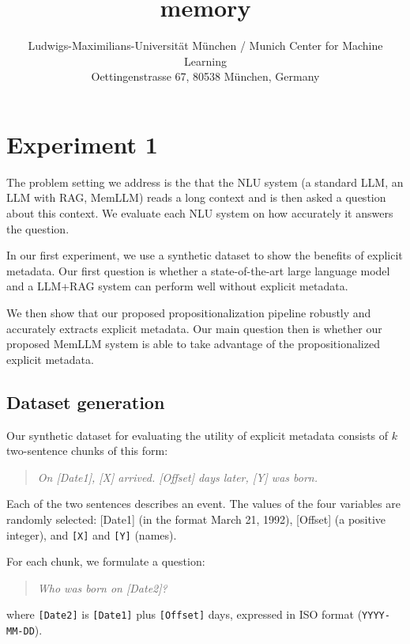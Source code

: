 \documentclass[11pt]{article}
\title{memory}
\author{  Ludwigs-Maximilians-Universität München / Munich Center for Machine Learning\\
  Oettingenstrasse 67, 80538 München, Germany \\
}
\begin{document}
\maketitle
\begin{abstract}

\end{abstract}



\section{Experiment 1}
The problem setting we address is the that the NLU system
(a standard LLM, an LLM with RAG, MemLLM) reads a long
context and is then asked a question about this context. We
evaluate each NLU system on how accurately it answers the question.


In our first experiment, we use a synthetic dataset to show
the benefits of explicit metadata.
Our first question is whether a state-of-the-art large
language model and a LLM+RAG system can perform well without explicit metadata.

We then show that our proposed propositionalization pipeline
robustly and accurately extracts explicit metadata.  Our
main question then is whether our proposed MemLLM system is
able to take advantage of the propositionalized explicit
metadata.



\subsection{Dataset generation}
Our synthetic dataset for evaluating the utility of explicit
metadata consists of $k$ two-sentence chunks of this form:

\begin{quote}
\emph{On [Date1], [X] arrived. [Offset] days later, [Y] was born.}
\end{quote}

Each of the two sentences describes an event.
The values of the four variables are randomly selected:
[Date1] (in the format March 21, 1992), [Offset]
(a positive integer), and
\texttt{[X]} and \texttt{[Y]} (names).

For each chunk, we formulate a question:
\begin{quote}
\emph{Who was born on [Date2]?}
\end{quote}
where \texttt{[Date2]} is \texttt{[Date1]}
plus \texttt{[Offset]} days, expressed in ISO format
(\texttt{YYYY-MM-DD}).
\end{document}
